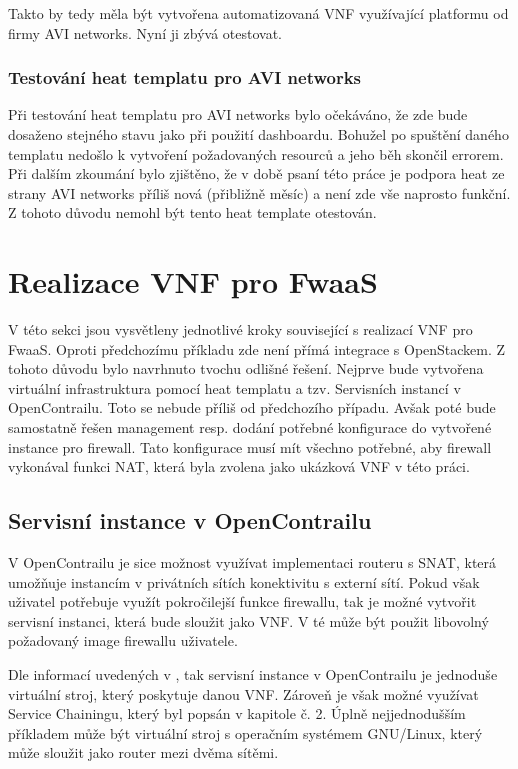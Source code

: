 Takto by tedy měla být vytvořena automatizovaná VNF využívající platformu od firmy AVI networks. Nyní ji zbývá otestovat.

\subsubsection{Testování heat templatu pro AVI networks}

Při testování heat templatu pro AVI networks bylo očekáváno, že zde bude dosaženo stejného stavu jako při použití dashboardu. Bohužel po spuštění daného templatu nedošlo k vytvoření požadovaných resourců a jeho běh skončil errorem. Při dalším zkoumání bylo zjištěno, že v době psaní této práce je podpora heat ze strany AVI networks příliš nová (přibližně měsíc) a není zde vše naprosto funkční. Z tohoto důvodu nemohl být tento heat template otestován. 

\section{Realizace VNF pro FwaaS}

V této sekci jsou vysvětleny jednotlivé kroky související s realizací VNF pro FwaaS. Oproti předchozímu příkladu zde není přímá integrace s OpenStackem. Z tohoto důvodu bylo navrhnuto tvochu odlišné řešení. Nejprve bude vytvořena virtuální infrastruktura pomocí heat templatu a tzv. Servisních instancí v OpenContrailu. Toto se nebude příliš od předchozího případu. Avšak poté bude samostatně řešen management resp. dodání potřebné konfigurace do vytvořené instance pro firewall. Tato konfigurace musí mít všechno potřebné, aby firewall vykonával funkci NAT, která byla zvolena jako ukázková VNF v této práci.

\subsection{Servisní instance v OpenContrailu}

V OpenContrailu je sice možnost využívat implementaci routeru s SNAT, která umožňuje instancím v privátních sítích konektivitu s externí sítí. Pokud však uživatel potřebuje využít pokročilejší funkce firewallu, tak je možné vytvořit servisní instanci, která bude sloužit jako VNF. V té může být použit libovolný požadovaný image firewallu uživatele.

Dle informací uvedených v \cite{opencontrail_web}, tak servisní instance v OpenContrailu je jednoduše virtuální stroj, který poskytuje danou VNF. Zároveň je však možné využívat Service Chainingu, který byl popsán v kapitole č. 2. Úplně nejjednodušším příkladem může být virtuální stroj s operačním systémem GNU/Linux, který může sloužit jako router mezi dvěma sítěmi. 

